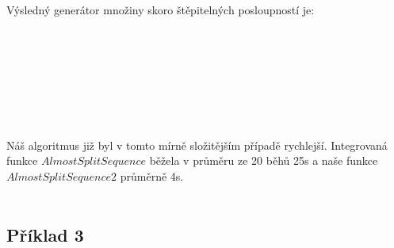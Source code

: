          Výsledný generátor množiny skoro štěpitelných posloupností je: 
         \\\\
         \centerline{} \\\\\\         \\\\
       \paragraph{ }Náš algoritmus již byl v tomto mírně složitějším případě rychlejší. Integrovaná 
       funkce $AlmostSplitSequence$ běžela v průměru ze 20 běhů 25s a naše 
       funkce $AlmostSplitSequence2$ průměrně 4s.
       \\\\
                      
       \subsection*{Příklad 3}
       
